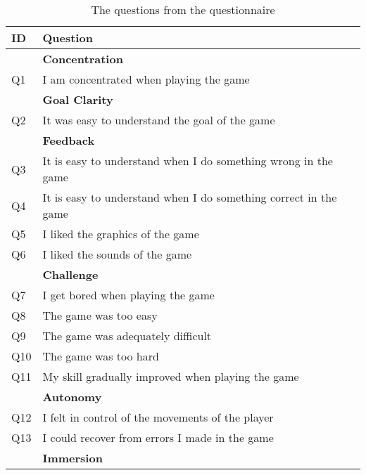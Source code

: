 \begin{table}[!ht]
	\centering
	\caption{The questions from the questionnaire}
	\label{tab:questions}
	\begin{tabular}{|l|l|}
		\hline
		\textbf{ID} & \textbf{Question}                                              \\ \hline
					& \textbf{Concentration}                                         \\ \hline
		Q1          & I am concentrated when playing the game                        \\ \hline
					& \textbf{Goal Clarity}                                          \\ \hline
		Q2          & It was easy to understand the goal of the game                 \\ \hline
					& \textbf{Feedback}                                              \\ \hline
		Q3          & It is easy to understand when I do something wrong in the game \\
		Q4          & It is easy to understand when I do something correct in the game  \\
		Q5          & I liked the graphics of the game                               \\
		Q6          & I liked the sounds of the game                                 \\ \hline
					& \textbf{Challenge}                                             \\ \hline
		Q7          & I get bored when playing the game                              \\
		Q8          & The game was too easy                                          \\
		Q9          & The game was adequately difficult                              \\
		Q10         & The game was too hard                                          \\
		Q11         & My skill gradually improved when playing the game              \\ \hline
					& \textbf{Autonomy}                                              \\ \hline
		Q12         & I felt in control of the movements of the player               \\
		Q13         & I could recover from errors I made in the game                 \\ \hline
					& \textbf{Immersion}                                             \\ \hline

\end{tabular}
\end{table}
